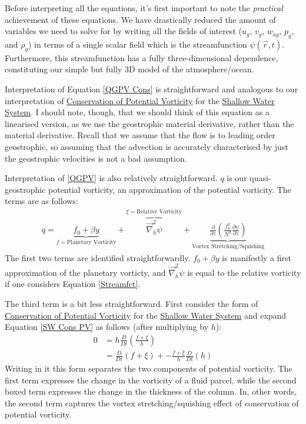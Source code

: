 Before interpreting all the equations, it's first important to note the \textit{practical} achievement of these equations. We have drastically reduced the amount of variables we need to solve for by writing all the fields of interest ($u_g$, $v_g$, $w_{ag}$, $p_g$, and $\rho_g$) in terms of a single scalar field which is the streamfunction $\psi(\vec{r},t)$. Furthermore, this streamfunction has a fully three-dimensional dependence, constituting our simple but fully 3D model of the atmosphere/ocean. 

Interpretation of Equation \ref{QGPV Cons} is straightforward and analogous to our interpretation of \hyperref[Cons PV Box]{Conservation of Potential Vorticity} for the \hyperref[Shallow Water System]{Shallow Water System}. I should note, though, that we should think of this equation as a linearised version, as we use the geostrophic material derivative, rather than the material derivative. Recall that we assume that the flow is to leading order geostrophic, so assuming that the advection is accurately characterised by just the geostrophic velocities is not a bad assumption.

Interpretation of \ref{QGPV} is also relatively straightforward. $q$ is our quasi-geostrophic potential vorticity, an approximation of the potential vorticity. The terms are as follows:
\begin{align*}
    q = \underbrace{f_0 + \beta y}_{f=\text{Planetary Vorticity}}
    +
    \overbrace{\vec{\nabla}_h^2 \psi}^{\xi=\text{Relative Vorticity}}
    +\underbrace{\frac{\partial }{\partial z}\left( \frac{f_0^2}{N^2} \frac{\partial \psi}{\partial z} \right)}_\text{Vortex Stretching/Squishing}
\end{align*}
The first two terms are identified straightforwardly. $f_0+\beta y$ is manifestly a first approximation of the planetary vorticty, and $\vec{\nabla}_h^2\psi$ is equal to the relative vorticity if one considers Equation \ref{Streamfct}. 

The third term is a bit less straightforward. First consider the form of \hyperref[Cons PV Box]{Conservation of Potential Vorticity} for the \hyperref[Shallow Water System]{Shallow Water System} and expand Equation \ref{SW Cons PV} as follows (after multiplying by $h$):
\begin{align*}
    0&=h\frac{D}{Dt}\left( \frac{f+\xi}{h} \right)
    \\
    &=
    \frac{D}{Dt}(f+\xi) + \boxed{-\frac{f+\xi}{h}\frac{D}{Dt}(h)}
\end{align*}
Writing in it this form separates the two components of potential vorticity. The first term expresses the change in the vorticity of a fluid parcel, while the second boxed term expresses the change in the thickness of the column. In, other words, the second term captures the vortex stretching/squishing effect of conservation of potential vorticity.

